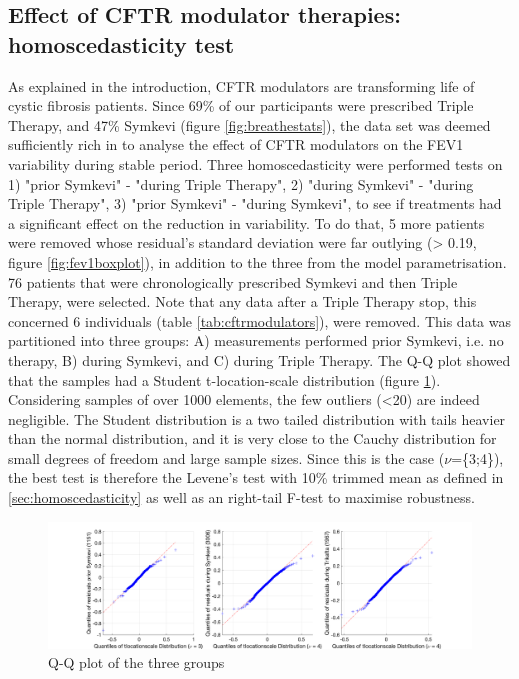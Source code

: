 \subsection{Effect of CFTR modulator therapies: homoscedasticity test} \label{sec:hptests}
As explained in the introduction, CFTR modulators are transforming life of cystic fibrosis patients. Since 69\% of our participants were prescribed Triple Therapy, and 47\% Symkevi (figure \ref{fig:breathestats}), the data set was deemed sufficiently rich in to analyse the effect of CFTR modulators on the FEV1 variability during stable period. Three homoscedasticity were performed tests on 1) "prior Symkevi" - "during Triple Therapy", 2) "during Symkevi" - "during Triple Therapy", 3) "prior Symkevi" - "during Symkevi", to see if treatments had a significant effect on the reduction in variability. To do that, 5 more patients were removed whose residual's standard deviation were far outlying (> 0.19, figure \ref{fig:fev1boxplot}), in addition to the three from the model parametrisation. 76 patients that were chronologically prescribed Symkevi and then Triple Therapy, were selected. Note that any data after a Triple Therapy stop, this concerned 6 individuals (table \ref{tab:cftrmodulators}), were removed. This data was partitioned into three groups: A) measurements performed prior Symkevi, i.e. no therapy, B) during Symkevi, and C) during Triple Therapy. The Q-Q plot showed that the samples had a Student t-location-scale distribution (figure \ref{fig:qqplot}). Considering samples of over 1000 elements, the few outliers (<20) are indeed negligible. The Student distribution is a two tailed distribution with tails heavier than the normal distribution, and it is very close to the Cauchy distribution for small degrees of freedom and large sample sizes. Since this is the case ($\nu$=\{3;4\}), the best test is therefore the Levene's test with 10\% trimmed mean as defined in \ref{sec:homoscedasticity} as well as an right-tail F-test to maximise robustness. 

\begin{figure}[!h]
    \centering
    \includegraphics[width=150mm]{images/fevModelBasedAnalysis_qqplot_none_smkv_trpl.png}
    \caption{Q-Q plot of the three groups}
    \label{fig:qqplot}
\end{figure}

